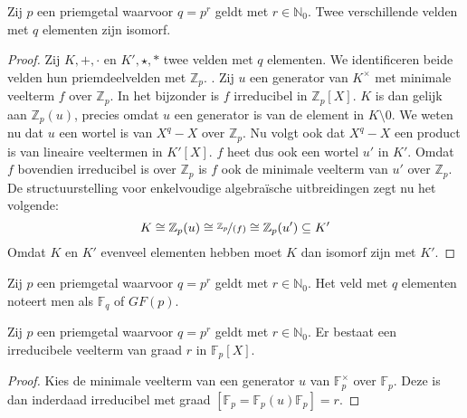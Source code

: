 \documentclass[main.tex]{subfiles}
\begin{document}
\begin{st}
  \label{st:priemveld-is-uniek}
  Zij $p$ een priemgetal waarvoor $q=p^{r}$ geldt met $r\in \mathbb{N}_{0}$.
  Twee verschillende velden met $q$ elementen zijn isomorf.

  \begin{proof}
    Zij $K,+,\cdot$ en $K',\star,*$ twee velden met $q$ elementen.
    We identificeren beide velden hun priemdeelvelden met $\mathbb{Z}_{p}$. .
    Zij $u$ een generator van $K^{\times}$ met minimale veelterm $f$ over $\mathbb{Z}_{p}$.
    In het bijzonder is $f$ irreducibel in $\mathbb{Z}_{p}[X]$. \waarom
    $K$ is dan gelijk aan $\mathbb{Z}_{p}(u)$, precies omdat $u$ een generator is van de element in $K\setminus 0$.
    We weten nu dat $u$ een wortel is van $X^{q}-X$ over $\mathbb{Z}_{p}$.
    Nu volgt ook dat $X^{q}-X$ een product is van lineaire veeltermen in $K'[X]$.\waarom
    $f$ heet dus ook een wortel $u'$ in $K'$.
    Omdat $f$ bovendien irreducibel is over $\mathbb{Z}_{p}$ is $f$ ook de minimale veelterm van $u'$ over $\mathbb{Z}_{p}$.
    De structuurstelling voor enkelvoudige algebra\"ische uitbreidingen zegt nu het volgende: \waarom
    \[ K \cong \mathbb{Z}_{p}(u) \cong \nicefrac{\mathbb{Z}_{p}}{(f)} \cong \mathbb{Z}_{p}(u') \subseteq K' \]
    Omdat $K$ en $K'$ evenveel elementen hebben moet $K$ dan isomorf zijn met $K'$.
  \end{proof}
\end{st}


\begin{de}
  Zij $p$ een priemgetal waarvoor $q=p^{r}$ geldt met $r\in \mathbb{N}_{0}$.
  Het veld met $q$ elementen noteert men als $\mathbb{F}_{q}$ of $GF(p)$.
\end{de}

\begin{st}
  Zij $p$ een priemgetal waarvoor $q=p^{r}$ geldt met $r\in \mathbb{N}_{0}$.
  Er bestaat een irreducibele veelterm van graad $r$ in $\mathbb{F}_{p}[X]$.

  \begin{proof}
    Kies de minimale veelterm van een generator $u$ van $\mathbb{F}_{p}^{\times}$ over $\mathbb{F}_{p}$.
    Deze is dan inderdaad irreducibel met graad $[\mathbb{F}_{p}=\mathbb{F}_{p}(u) \mathbb{F}_{p}] = r$.
  \end{proof}
\end{st}
\end{document}
